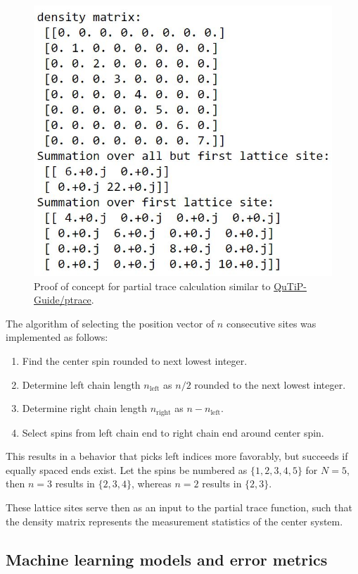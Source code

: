 \documentclass[reprint,amsmath,amssymb,aps,prb]{revtex4-2}
\begin{document}
\begin{figure}[h!]
\centering
\includegraphics[width=0.7\linewidth]{figures/partialtrace_proof_of_concept}
\caption{Proof of concept for partial trace calculation similar to \protect\hyperlink{http://qutip.org/docs/3.1.0/guide/guide-tensor.html}{QuTiP-Guide/ptrace}.}
\label{fig:partialtrace_proof_of_concept}
\end{figure}

The algorithm of selecting the position vector of $n$ consecutive sites was implemented as follows: 
\begin{enumerate}
	\item Find the center spin rounded to next lowest integer.
	\item Determine left chain length $n_\text{left}$ as $n/2$ rounded to the next lowest integer.
	\item Determine right chain length $n_\text{right}$ as $n-n_\text{left}$.
	\item Select spins from left chain end to right chain end around center spin.
\end{enumerate}
This results in a behavior that picks left indices more favorably, but succeeds if equally spaced ends exist. Let the spins be numbered as $\{1, 2, 3, 4, 5\}$ for $N=5$, then  $n=3$ results in $\{2, 3, 4\}$, whereas $n=2$ results in $\{2, 3\}$.

These lattice sites serve then as an input to the partial trace function, such that the density matrix represents the measurement statistics of the center system.

\subsection{Machine learning models and error metrics}\label{sec:nn}
\end{document}
